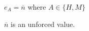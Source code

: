 \begin{case}

$e_{A}=\overline{n}$ where $A\in\lbrace H,M\rbrace$

$\overline{n}$ is an unforced value.

\end{case}